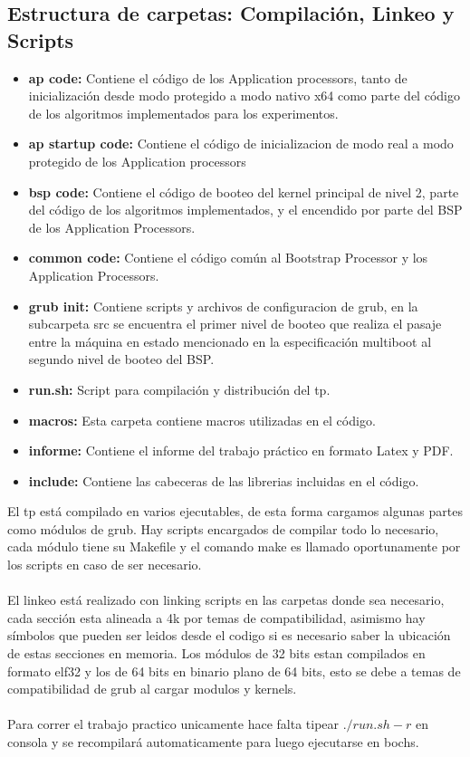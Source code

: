    \subsection{Estructura de carpetas: Compilación, Linkeo y Scripts}
    \begin{itemize}
	    \item \textbf{ap code: } Contiene el código de los Application processors, tanto de inicialización desde modo protegido a modo nativo x64 como parte del código de los algoritmos implementados para los experimentos.
		\item \textbf{ap startup code: } Contiene el código de inicializacion de modo real a modo protegido de los Application processors
		\item \textbf{bsp code: } Contiene el código de booteo del kernel principal de nivel 2, parte del código de los algoritmos implementados, y el encendido por parte del BSP de los Application Processors.
		\item \textbf{common code: } Contiene el código común al Bootstrap Processor y los Application Processors.
		\item \textbf{grub init: } Contiene scripts y archivos de configuracion de grub, en la subcarpeta src se encuentra el primer nivel de booteo que realiza el pasaje entre la máquina en estado mencionado en la especificación multiboot al segundo nivel de booteo del BSP.
		\item \textbf{run.sh: } Script para compilación y distribución del tp.
		\item \textbf{macros: } Esta carpeta contiene macros utilizadas en el código.
		\item \textbf{informe: } Contiene el informe del trabajo práctico en formato Latex y PDF.
		\item \textbf{include: } Contiene las cabeceras de las librerias incluidas en el código.
    \end{itemize}

    El tp está compilado en varios ejecutables, de esta forma cargamos algunas partes como módulos de grub.
    Hay scripts encargados de compilar todo lo necesario, cada módulo tiene su Makefile y el comando make es llamado
    oportunamente por los scripts en caso de ser necesario.
    \\
    \\
    El linkeo está realizado con linking scripts en las carpetas donde sea necesario,
    cada sección esta alineada a 4k por temas de compatibilidad, asimismo hay símbolos que pueden ser leidos desde el codigo si es necesario saber la ubicación de estas secciones en memoria.
    Los módulos de 32 bits estan compilados en formato elf32 y los de 64 bits en binario plano de 64 bits, esto se debe a temas de compatibilidad de grub al cargar modulos y kernels.
    \\
    \\
    Para correr el trabajo practico unicamente hace falta tipear $./run.sh -r$ en consola y se recompilará automaticamente para luego ejecutarse en bochs.
